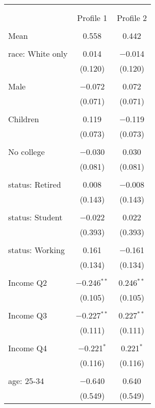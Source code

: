 
\begin{tabular}{@{\extracolsep{5pt}}lcc} 
\\[-1.8ex]\hline 
\hline \\[-1.8ex] 
\\[-1.8ex] & Profile 1 & Profile 2 \\ 
\hline \\[-1.8ex] 
 Mean & 0.558 & 0.442  \\ \hline \\[-1.8ex] race: White only & 0.014 & $-$0.014 \\ 
  & (0.120) & (0.120) \\ 
  & & \\ 
 Male & $-$0.072 & 0.072 \\ 
  & (0.071) & (0.071) \\ 
  & & \\ 
 Children & 0.119 & $-$0.119 \\ 
  & (0.073) & (0.073) \\ 
  & & \\ 
 No college & $-$0.030 & 0.030 \\ 
  & (0.081) & (0.081) \\ 
  & & \\ 
 status: Retired & 0.008 & $-$0.008 \\ 
  & (0.143) & (0.143) \\ 
  & & \\ 
 status: Student & $-$0.022 & 0.022 \\ 
  & (0.393) & (0.393) \\ 
  & & \\ 
 status: Working & 0.161 & $-$0.161 \\ 
  & (0.134) & (0.134) \\ 
  & & \\ 
 Income Q2 & $-$0.246$^{**}$ & 0.246$^{**}$ \\ 
  & (0.105) & (0.105) \\ 
  & & \\ 
 Income Q3 & $-$0.227$^{**}$ & 0.227$^{**}$ \\ 
  & (0.111) & (0.111) \\ 
  & & \\ 
 Income Q4 & $-$0.221$^{*}$ & 0.221$^{*}$ \\ 
  & (0.116) & (0.116) \\ 
  & & \\ 
 age: 25-34 & $-$0.640 & 0.640 \\ 
  & (0.549) & (0.549) \\ 

\end{tabular}
